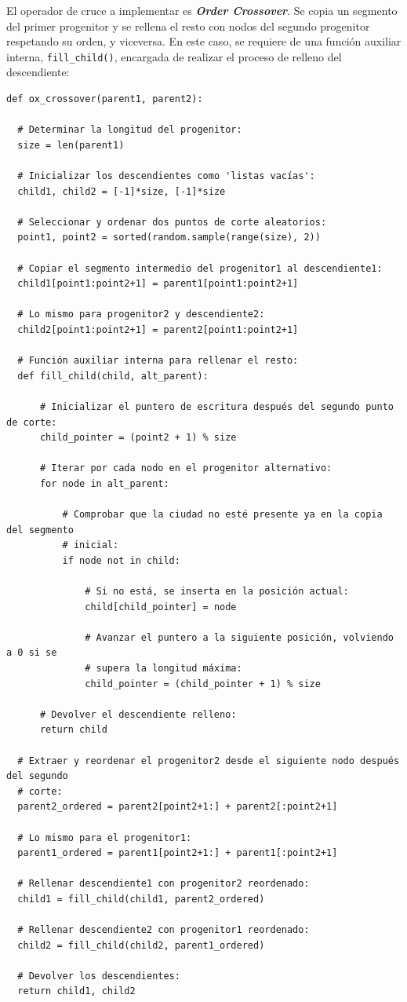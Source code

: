 El operador de cruce a implementar es \textbf{\textit{Order Crossover}}. Se copia un segmento del primer progenitor y se 
rellena el resto con nodos del segundo progenitor respetando su orden, y viceversa. En este caso, se requiere de una función
auxiliar interna, \texttt{fill\_child()}, encargada de realizar el proceso de relleno del descendiente:
\newline
\begin{lstlisting}[style=PythonStyle]
def ox_crossover(parent1, parent2):

  # Determinar la longitud del progenitor:
  size = len(parent1)

  # Inicializar los descendientes como 'listas vacías':
  child1, child2 = [-1]*size, [-1]*size
  
  # Seleccionar y ordenar dos puntos de corte aleatorios:
  point1, point2 = sorted(random.sample(range(size), 2))

  # Copiar el segmento intermedio del progenitor1 al descendiente1:
  child1[point1:point2+1] = parent1[point1:point2+1]

  # Lo mismo para progenitor2 y descendiente2:
  child2[point1:point2+1] = parent2[point1:point2+1]
  
  # Función auxiliar interna para rellenar el resto:
  def fill_child(child, alt_parent):

      # Inicializar el puntero de escritura después del segundo punto de corte: 
      child_pointer = (point2 + 1) % size

      # Iterar por cada nodo en el progenitor alternativo:
      for node in alt_parent:

          # Comprobar que la ciudad no esté presente ya en la copia del segmento
          # inicial:
          if node not in child:

              # Si no está, se inserta en la posición actual:
              child[child_pointer] = node

              # Avanzar el puntero a la siguiente posición, volviendo a 0 si se
              # supera la longitud máxima:
              child_pointer = (child_pointer + 1) % size

      # Devolver el descendiente relleno:
      return child

  # Extraer y reordenar el progenitor2 desde el siguiente nodo después del segundo 
  # corte:
  parent2_ordered = parent2[point2+1:] + parent2[:point2+1]

  # Lo mismo para el progenitor1:
  parent1_ordered = parent1[point2+1:] + parent1[:point2+1]

  # Rellenar descendiente1 con progenitor2 reordenado:
  child1 = fill_child(child1, parent2_ordered)

  # Rellenar descendiente2 con progenitor1 reordenado:
  child2 = fill_child(child2, parent1_ordered)

  # Devolver los descendientes:
  return child1, child2
\end{lstlisting}

